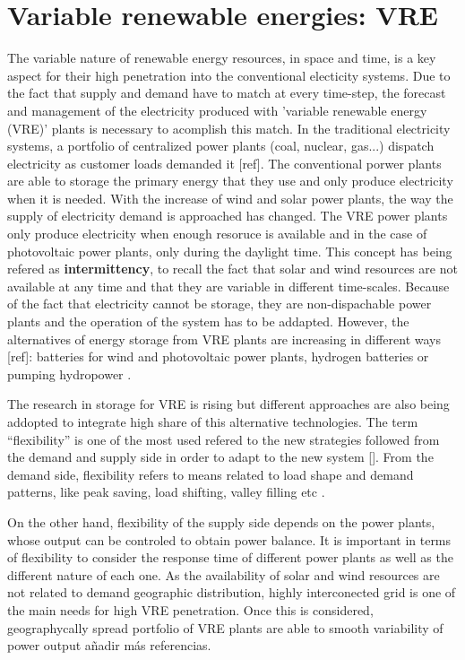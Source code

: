 \section{Variable renewable energies: VRE}

The variable nature of renewable energy resources, in space and time, is a key aspect for their high penetration into the conventional electicity systems. Due to the fact that supply and demand have to match at every time-step, the forecast and management of the electricity produced with 'variable renewable energy (VRE)' plants is necessary to acomplish this match. In the traditional electricity systems, a portfolio of centralized power plants (coal, nuclear, gas...) dispatch electricity as customer loads demanded it [ref]. The conventional porwer plants are able to storage the primary energy that they use and only produce electricity when it is needed. With the increase of wind and solar power plants, the way the supply of electricity demand is approached has changed. The VRE power plants only produce electricity when enough resoruce is available and in the case of photovoltaic power plants, only during the daylight time. This concept has being refered as \textbf{intermittency}, to recall the fact that solar and wind resources are not available at any time and that they are variable in different time-scales. Because of the fact that electricity cannot be storage, they are non-dispachable power plants and the operation of the system has to be addapted. However, the alternatives of energy storage from VRE plants are increasing in different ways [ref]: batteries for wind and photovoltaic power plants, hydrogen batteries or pumping hydropower \cite*{Lund2015}.

The research in storage for VRE is rising but different approaches are also being addopted to integrate high share of this alternative technologies. The term ``flexibility'' is one of the most used refered to the new strategies followed from the demand and supply side in order to adapt to the new system []. From the demand side, flexibility refers to means related to load shape and demand patterns, like peak saving, load shifting, valley filling etc \cite*{Lund2015}.

On the other hand, flexibility of the supply side depends on the power plants, whose output can be controled to obtain power balance. It is important in terms of flexibility to consider the response time of different power plants as well as the different nature of each one. As the availability of solar and wind resources are not related to demand geographic distribution, highly interconected grid is one of the main needs for high VRE penetration. Once this is considered, geographycally spread portfolio of VRE plants are able to smooth variability of power output \cite*{KROPOSKI2017}{añadir más referencias}.

